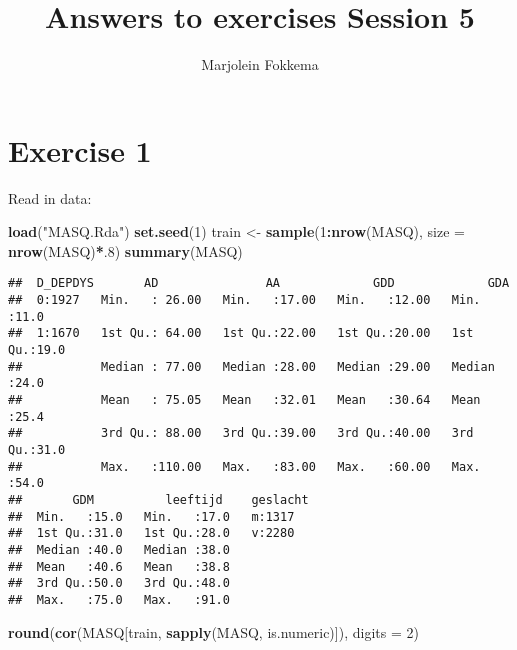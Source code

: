 \documentclass[
]{article}
\title{Answers to exercises Session 5}
\author{Marjolein Fokkema}
\date{}
\newenvironment{Shaded}{\begin{snugshade}}{\end{snugshade}}
\newcommand{\AttributeTok}[1]{\textcolor[rgb]{0.13,0.29,0.53}{#1}}
\newcommand{\DecValTok}[1]{\textcolor[rgb]{0.00,0.00,0.81}{#1}}
\newcommand{\FunctionTok}[1]{\textcolor[rgb]{0.13,0.29,0.53}{\textbf{#1}}}
\newcommand{\NormalTok}[1]{#1}
\newcommand{\OtherTok}[1]{\textcolor[rgb]{0.56,0.35,0.01}{#1}}
\newcommand{\SpecialCharTok}[1]{\textcolor[rgb]{0.81,0.36,0.00}{\textbf{#1}}}
\newcommand{\StringTok}[1]{\textcolor[rgb]{0.31,0.60,0.02}{#1}}
\begin{document}
\maketitle

\hypertarget{exercise-1}{%
\section{Exercise 1}\label{exercise-1}}

Read in data:

\begin{Shaded}
\begin{Highlighting}[]
\FunctionTok{load}\NormalTok{(}\StringTok{"MASQ.Rda"}\NormalTok{)}
\FunctionTok{set.seed}\NormalTok{(}\DecValTok{1}\NormalTok{)}
\NormalTok{train }\OtherTok{\textless{}{-}} \FunctionTok{sample}\NormalTok{(}\DecValTok{1}\SpecialCharTok{:}\FunctionTok{nrow}\NormalTok{(MASQ), }\AttributeTok{size =} \FunctionTok{nrow}\NormalTok{(MASQ)}\SpecialCharTok{*}\NormalTok{.}\DecValTok{8}\NormalTok{)}
\FunctionTok{summary}\NormalTok{(MASQ)}
\end{Highlighting}
\end{Shaded}

\begin{verbatim}
##  D_DEPDYS       AD               AA             GDD             GDA      
##  0:1927   Min.   : 26.00   Min.   :17.00   Min.   :12.00   Min.   :11.0  
##  1:1670   1st Qu.: 64.00   1st Qu.:22.00   1st Qu.:20.00   1st Qu.:19.0  
##           Median : 77.00   Median :28.00   Median :29.00   Median :24.0  
##           Mean   : 75.05   Mean   :32.01   Mean   :30.64   Mean   :25.4  
##           3rd Qu.: 88.00   3rd Qu.:39.00   3rd Qu.:40.00   3rd Qu.:31.0  
##           Max.   :110.00   Max.   :83.00   Max.   :60.00   Max.   :54.0  
##       GDM          leeftijd    geslacht
##  Min.   :15.0   Min.   :17.0   m:1317  
##  1st Qu.:31.0   1st Qu.:28.0   v:2280  
##  Median :40.0   Median :38.0           
##  Mean   :40.6   Mean   :38.8           
##  3rd Qu.:50.0   3rd Qu.:48.0           
##  Max.   :75.0   Max.   :91.0
\end{verbatim}

\begin{Shaded}
\begin{Highlighting}[]
\FunctionTok{round}\NormalTok{(}\FunctionTok{cor}\NormalTok{(MASQ[train, }\FunctionTok{sapply}\NormalTok{(MASQ, is.numeric)]), }\AttributeTok{digits =} \DecValTok{2}\NormalTok{)}
\end{Highlighting}
\end{Shaded}
\end{document}
